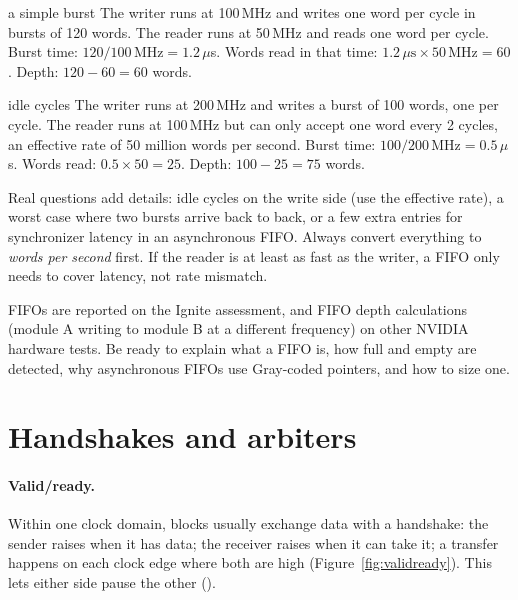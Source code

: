 \begin{worked}{a simple burst}
The writer runs at 100\,MHz and writes one word per cycle in bursts of 120 words. The reader runs at 50\,MHz and reads one word per cycle. Burst time: $120/100\,\text{MHz} = 1.2\,\mu$s. Words read in that time: $1.2\,\mu\text{s} \times 50\,\text{MHz} = 60$. Depth: $120 - 60 = 60$ words.
\end{worked}

\begin{worked}{idle cycles}
The writer runs at 200\,MHz and writes a burst of 100 words, one per cycle. The reader runs at 100\,MHz but can only accept one word every 2 cycles, an effective rate of 50 million words per second. Burst time: $100/200\,\text{MHz} = 0.5\,\mu$s. Words read: $0.5 \times 50 = 25$. Depth: $100 - 25 = 75$ words.
\end{worked}

Real questions add details: idle cycles on the write side (use the effective rate), a worst case where two bursts arrive back to back, or a few extra entries for synchronizer latency in an asynchronous FIFO. Always convert everything to \emph{words per second} first. If the reader is at least as fast as the writer, a FIFO only needs to cover latency, not rate mismatch.

\begin{onoa}
FIFOs are reported on the Ignite assessment, and FIFO depth calculations (module A writing to module B at a different frequency) on other NVIDIA hardware tests. Be ready to explain what a FIFO is, how full and empty are detected, why asynchronous FIFOs use Gray-coded pointers, and how to size one.
\end{onoa}

\section{Handshakes and arbiters}
\label{sec:handshake}

\paragraph{Valid/ready.} Within one clock domain, blocks usually exchange data with a  handshake: the sender raises  when it has data; the receiver raises  when it can take it; a transfer happens on each clock edge where both are high (Figure~\ref{fig:validready}). This lets either side pause the other ().

